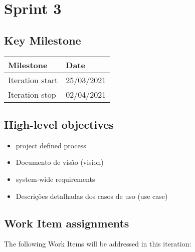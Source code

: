 \clearpage
\section{Sprint 3}

\subsection*{Key Milestone}


\noindent\begin{tabular}{|l|l|}
\hline
Milestone       & Date \\ \hline
Iteration start & 25/03/2021 \\ \hline
Iteration stop  & 02/04/2021 \\ \hline
\end{tabular}

\subsection*{High-level objectives}

\begin{itemize}
	\item project defined process
	\item Documento de visão (vision)
	\item system-wide requirements
	\item Descrições detalhadas dos casos de uso (use case)
\end{itemize}

\subsection*{Work Item assignments}


The following Work Items will be addressed in this iteration:

